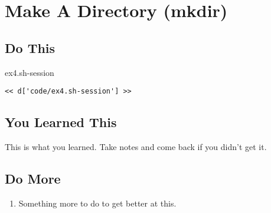 \chapter{Make A Directory (mkdir)}

\section{Do This}

\begin{code}{ex4.sh-session}
\begin{Verbatim}
<< d['code/ex4.sh-session'] >>
\end{Verbatim}
\end{code}


\section{You Learned This}

This is what you learned.  Take notes and come back if you didn't get it.

\section{Do More}

\begin{enumerate}
\item Something more to do to get better at this.
\end{enumerate}

